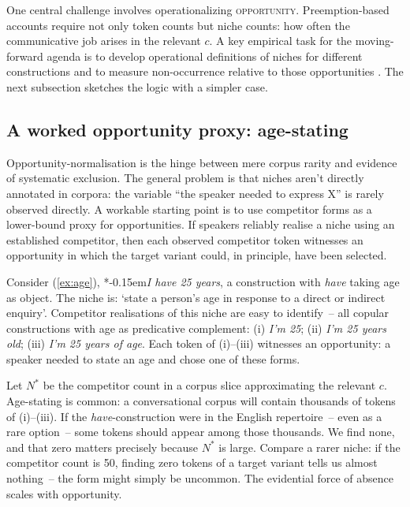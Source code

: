 \documentclass[12pt,letterpaper]{article}
\newcommand{\term}[1]{\textsc{#1}}
\newcommand{\mention}[1]{\textit{#1}}
\newcommand{\judgesep}{\kern-0.15em}
\newcommand{\ungram}[1]{*\judgesep#1}
\begin{document}
One central challenge involves operationalizing \term{opportunity}. Preemption-based accounts require not only token counts but niche counts: how often the communicative job arises in the relevant $c$. A key empirical task for the moving-forward agenda is to develop operational definitions of niches for different constructions and to measure non-occurrence relative to those opportunities \autocite[for a corpus-based implementation using Bayesian partial pooling over construction-specific opportunity sets, see][]{reynolds2026lbe}. The next subsection sketches the logic with a simpler case.

\subsection{A worked opportunity proxy: age-stating}\label{sec:opportunity-worked}

Opportunity-normalisation is the hinge between mere corpus rarity and evidence of systematic exclusion. The general problem is that niches aren't directly annotated in corpora: the variable \enquote{the speaker needed to express X} is rarely observed directly. A workable starting point is to use competitor forms as a lower-bound proxy for opportunities. If speakers reliably realise a niche using an established competitor, then each observed competitor token witnesses an opportunity in which the target variant could, in principle, have been selected.

Consider (\ref{ex:age}), \ungram{\mention{I have 25 years}}, a construction with \mention{have} taking age as object. The niche is: `state a person's age in response to a direct or indirect enquiry'. Competitor realisations of this niche are easy to identify~-- all copular constructions with age as predicative complement:
(i) \mention{I'm 25};
(ii) \mention{I'm 25 years old};
(iii) \mention{I'm 25 years of age}.
Each token of (i)--(iii) witnesses an opportunity: a speaker needed to state an age and chose one of these forms.

Let $N^{\ast}$ be the competitor count in a corpus slice approximating the relevant $c$. Age-stating is common: a conversational corpus will contain thousands of tokens of (i)--(iii). If the \mention{have}-construction were in the English repertoire~-- even as a rare option~-- some tokens should appear among those thousands. We find none, and that zero matters precisely because $N^{\ast}$ is large. Compare a rarer niche: if the competitor count is 50, finding zero tokens of a target variant tells us almost nothing~-- the form might simply be uncommon. The evidential force of absence scales with opportunity.
\end{document}
